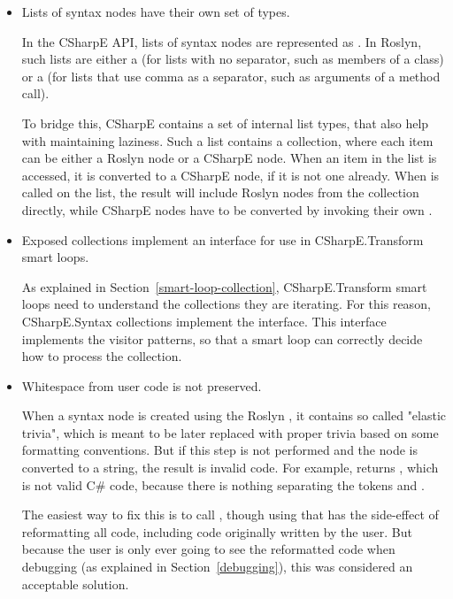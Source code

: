 \begin{itemize}
\begin{enumerate}
\end{enumerate}

\item Lists of syntax nodes have their own set of types.

In the CSharpE \ac{API}, lists of syntax nodes are represented as . In Roslyn, such lists are either a  (for lists with no separator, such as members of a class) or a  (for lists that use comma as a separator, such as arguments of a method call).

To bridge this, CSharpE contains a set of internal list types, that also help with maintaining laziness. Such a list contains a collection, where each item can be either a Roslyn node or a CSharpE node. When an item in the list is accessed, it is converted to a CSharpE node, if it is not one already. When  is called on the list, the result will include Roslyn nodes from the collection directly, while CSharpE nodes have to be converted by invoking their own .

\item Exposed collections implement an interface for use in CSharpE.Transform smart loops.

As explained in Section~\ref{smart-loop-collection}, CSharpE.Transform smart loops need to understand the collections they are iterating. For this reason, CSharpE.Syntax collections implement the  interface. This interface implements the visitor patterns, so that a smart loop can correctly decide how to process the collection.

\item Whitespace from user code is not preserved.

When a syntax node is created using the Roslyn , it contains so called "elastic trivia", which is meant to be later replaced with proper trivia based on some formatting conventions. But if this step is not performed and the node is converted to a string, the result is invalid code. For example,  returns , which is not valid C\# code, because there is nothing separating the tokens  and .

The easiest way to fix this is to call , though using that has the side-effect of reformatting all code, including code originally written by the user. But because the user is only ever going to see the reformatted code when debugging (as explained in Section~\ref{debugging}), this was considered an acceptable solution.
\end{itemize}

